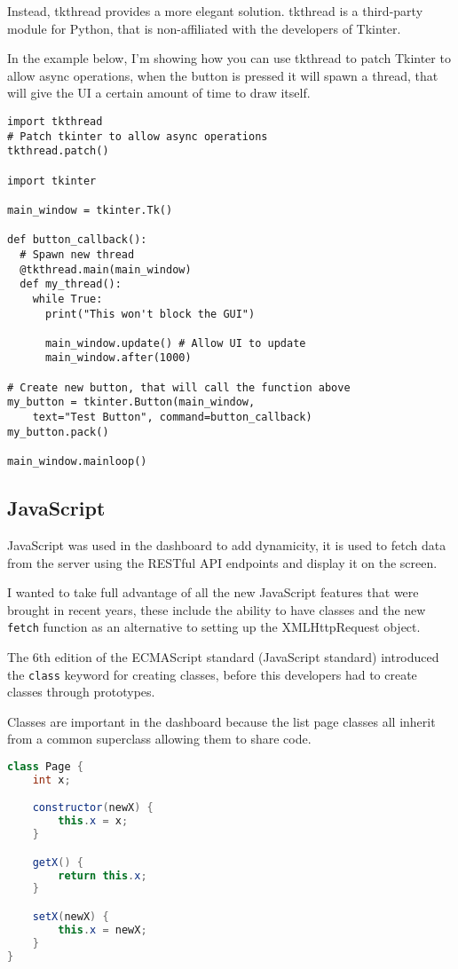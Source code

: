 Instead, tkthread provides a more elegant solution.
tkthread is a third-party module for Python,
that is non-affiliated with the developers of Tkinter.

In the example below, I'm showing how you can use tkthread to patch
Tkinter to allow async operations,
when the button is pressed it will spawn a thread,
that will give the UI a certain amount of time to draw itself.

\begin{lstlisting}
import tkthread
# Patch tkinter to allow async operations
tkthread.patch()

import tkinter

main_window = tkinter.Tk()

def button_callback():
  # Spawn new thread
  @tkthread.main(main_window)
  def my_thread():
    while True:
      print("This won't block the GUI")
      
      main_window.update() # Allow UI to update
      main_window.after(1000)

# Create new button, that will call the function above
my_button = tkinter.Button(main_window,
    text="Test Button", command=button_callback)
my_button.pack()

main_window.mainloop()
\end{lstlisting}

\subsection{JavaScript}
JavaScript was used in the dashboard to add dynamicity,
it is used to fetch data from the server using the RESTful API endpoints
and display it on the screen.

I wanted to take full advantage of all the new JavaScript features that were brought in
recent years, these include the ability to have classes and
the new \texttt{fetch} function as an alternative to setting up the XMLHttpRequest object.

The 6th edition of the ECMAScript standard \cite{ES6} (JavaScript standard) 
introduced the \texttt{class} keyword for creating classes,
before this developers had to create classes through prototypes.

Classes are important in the dashboard because the list page classes
all inherit from a common superclass allowing them to share code.

\begin{lstlisting}[language=Java]
class Page {
    int x;

    constructor(newX) {
        this.x = x;
    }

    getX() {
        return this.x;
    }

    setX(newX) {
        this.x = newX;
    }
}
\end{lstlisting}

